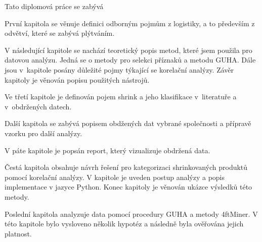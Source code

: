 Tato diplomová práce se zabývá %

První kapitola se věnuje definici odborným pojmům z logistiky, a to především z odvětví, které se zabývá plýtváním. 

V následující kapitole se nachází teoretický popis metod, které jsem použila pro datovou analýzu. Jedná se o metody pro selekci příznaků a metodu GUHA. Dále jsou v~kapitole posány důležité pojmy týkající se korelační analýzy. Závěr kapitoly je věnován popisu použitých nástrojů.

Ve třetí kapitole je definován pojem shrink a jeho klasifikace v~literatuře a v~obdržených datech.

Další kapitola se zabývá popisem obdžených dat vybrané společnosti a přípravě vzorku pro další analýzy.

V páte kapitole je popsán report, který vizualizuje obdržená data.

Čestá kapitola obsahuje návrh řešení pro kategorizaci shrinkovaných produktů pomocí korelační analýzy. V kapitole je uveden postup analýzy a popis implementace v jazyce Python. Konec kapitoly je věnován ukázce výsledků této metody.

Poslední kapitola analyzuje data pomocí procedury GUHA a metody 4ftMiner. V této kapitole bylo vysloveno několik hypotéz a následně byla ověřována jejich platnost.




